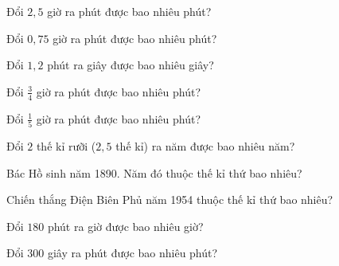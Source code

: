 \begin{ex}
  Đổi $2{,}5$ giờ ra phút được bao nhiêu phút?
\end{ex}

\begin{ex}
  Đổi $0{,}75$ giờ ra phút được bao nhiêu phút?
\end{ex}

\begin{ex}
  Đổi $1{,}2$ phút ra giây được bao nhiêu giây?
\end{ex}

\begin{ex}
  Đổi $\frac{3}{4}$ giờ ra phút được bao nhiêu phút?
\end{ex}

\begin{ex}
  Đổi $\frac{1}{5}$ giờ ra phút được bao nhiêu phút?
\end{ex}

\begin{ex}
  Đổi $2$ thế kỉ rưỡi ($2{,}5$ thế kỉ) ra năm được bao nhiêu năm?
\end{ex}

\begin{ex}
  Bác Hồ sinh năm 1890. Năm đó thuộc thế kỉ thứ bao nhiêu?
\end{ex}

\begin{ex}
  Chiến thắng Điện Biên Phủ năm 1954 thuộc thế kỉ thứ bao nhiêu?
\end{ex}

\begin{ex}
  Đổi $180$ phút ra giờ được bao nhiêu giờ?
\end{ex}

\begin{ex}
  Đổi $300$ giây ra phút được bao nhiêu phút?
\end{ex}

